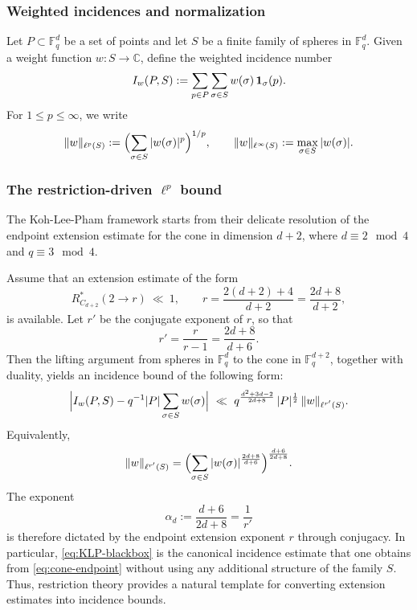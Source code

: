 \documentclass{article}
\begin{document}
\subsubsection*{Weighted incidences and normalization}

Let $P\subset \mathbb{F}_q^d$ be a set of points and let $S$ be a finite family of spheres in $\mathbb{F}_q^d$.
Given a weight function $w:S\to \mathbb{C}$, define the weighted incidence number
\[
I_w(P,S)
:=
\sum_{p\in P}\sum_{\sigma\in S} w(\sigma)\,{\bf 1}_{\sigma}(p).
\]
For $1\le p\le \infty$, we write
\[
\|w\|_{\ell^p(S)}
:=
\Bigl(\sum_{\sigma\in S}|w(\sigma)|^p\Bigr)^{1/p},
\qquad
\|w\|_{\ell^\infty(S)}:=\max_{\sigma\in S}|w(\sigma)|.
\]




\subsubsection*{The restriction-driven $\ell^p$ bound}

The Koh-Lee-Pham framework starts from their delicate resolution of the endpoint
extension estimate for the cone in dimension $d+2$, where $d\equiv 2\mod 4$ and $q\equiv 3\mod 4$.

Assume that an extension estimate of the form
\begin{equation}\label{eq:cone-endpoint}
R^*_{C_{d+2}}(2\to r)\ \ll\ 1,
\qquad
r=\frac{2(d+2)+4}{d+2}=\frac{2d+8}{d+2},
\end{equation}
is available.
Let $r'$ be the conjugate exponent of $r$, so that
\[
r'=\frac{r}{r-1}=\frac{2d+8}{d+6}.
\]
Then the lifting argument from spheres in $\mathbb{F}_q^d$ to the cone in $\mathbb{F}_q^{d+2}$, together with duality, yields an incidence bound of the following form:
\begin{equation}\label{eq:KLP-blackbox}
\Bigl|I_w(P,S)-q^{-1}|P|\sum_{\sigma\in S} w(\sigma)\Bigr|
\ \ll\
q^{\frac{d^2+3d-2}{2d+8}}\,
|P|^{\frac{1}{2}}\,
\|w\|_{\ell^{r'}(S)}.
\end{equation}
Equivalently,
\[
\|w\|_{\ell^{r'}(S)}
=
\Bigl(\sum_{\sigma\in S}|w(\sigma)|^{\frac{2d+8}{d+6}}\Bigr)^{\frac{d+6}{2d+8}}.
\]
The exponent
\[
\alpha_d:=\frac{d+6}{2d+8}=\frac{1}{r'}
\]
is therefore dictated by the endpoint extension exponent $r$ through conjugacy.
In particular, \eqref{eq:KLP-blackbox} is the canonical incidence estimate that one obtains from \eqref{eq:cone-endpoint} without using any additional structure of the family $S$. Thus, restriction theory provides a natural template for converting extension estimates into
incidence bounds.
\end{document}
